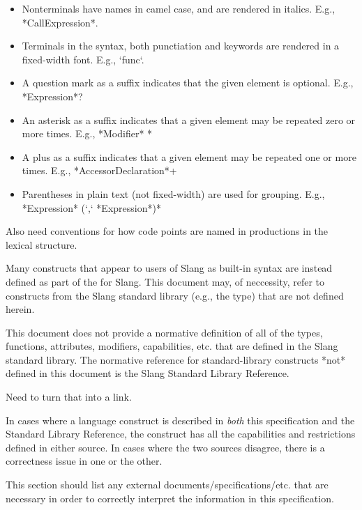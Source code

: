 \begin{itemize}
    \item{Nonterminals have names in camel case, and are rendered in italics. E.g., *CallExpression*.}
    \item{Terminals in the syntax, both punctiation and keywords are rendered in a fixed-width font. E.g., `func`.}
    \item{A question mark as a suffix indicates that the given element is optional. E.g., *Expression*?}
    \item{An asterisk as a suffix indicates that a given element may be repeated zero or more times. E.g., *Modifier* *}
    \item{A plus as a suffix indicates that a given element may be repeated one or more times. E.g., *AccessorDeclaration*+}
    \item{Parentheses in plain text (not fixed-width) are used for grouping. E.g., *Expression* (`,` *Expression*)*}
\end{itemize}

\begin{Incomplete}
Also need conventions for how code points are named in productions in the lexical structure.    
\end{Incomplete}



Many constructs that appear to users of Slang as built-in syntax are instead defined as part of the  for Slang.
This document may, of neccessity, refer to constructs from the Slang standard library (e.g., the  type) that are not defined herein.

This document does not provide a normative definition of all of the types, functions, attributes, modifiers, capabilities, etc. that are defined in the Slang standard library.
The normative reference for standard-library constructs *not* defined in this document is the Slang Standard Library Reference.

\begin{Incomplete}
Need to turn that into a link.
\end{Incomplete}

In cases where a language construct is described in \emph{both} this specification and the Standard Library Reference, the construct has all the capabilities and restrictions defined in either source.
In cases where the two sources disagree, there is a correctness issue in one or the other.


\begin{Incomplete}
This section should list any external documents/specifications/etc. that are necessary in order to correctly interpret the information in this specification.
\end{Incomplete}